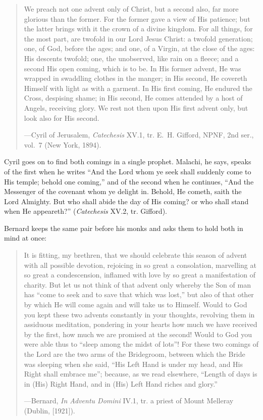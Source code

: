 \begin{quote}
We preach not one advent only of Christ, but a second also, far more glorious than the former.
For the former gave a view of His patience; but the latter brings with it the crown of a divine
kingdom. For all things, for the most part, are twofold in our Lord Jesus Christ: a twofold
generation; one, of God, before the ages; and one, of a Virgin, at the close of the ages: His
descents twofold; one, the unobserved, like rain on a fleece; and a second His open coming,
which is to be. In His former advent, He was wrapped in swaddling clothes in the manger; in His
second, He covereth Himself with light as with a garment. In His first coming, He endured the
Cross, despising shame; in His second, He comes attended by a host of Angels, receiving glory. We
rest not then upon His first advent only, but look also for His second.\par
{\smallskip\noindent\small ---Cyril of Jerusalem, \textit{Catechesis} XV.1, tr. E.~H. Gifford,
NPNF, 2nd ser., vol.~7 (New York, 1894).\par}
\end{quote}

Cyril goes on to find both comings in a single prophet. Malachi, he says, speaks of the first when he writes ``And the Lord whom ye seek shall suddenly come to His
temple; behold one coming,'' and of the second when he continues, ``And the Messenger of the
covenant whom ye delight in. Behold, He cometh, saith the Lord Almighty. But who shall abide the
day of His coming? or who shall stand when He appeareth?'' (\textit{Catechesis} XV.2, tr.
Gifford).

Bernard keeps the same pair before his monks and asks them to hold both in mind at once:

\begin{quote}
It is fitting, my brethren, that we should celebrate this season of advent with all possible
devotion, rejoicing in so great a consolation, marvelling at so great a condescension, inflamed
with love by so great a manifestation of charity. But let us not think of that advent only
whereby the Son of man has ``come to seek and to save that which was lost,'' but also of that
other by which He will come again and will take us to Himself. Would to God you kept these two
advents constantly in your thoughts, revolving them in assiduous meditation, pondering in your
hearts how much we have received by the first, how much we are promised at the second! Would to
God you were able thus to ``sleep among the midst of lots''! For these two comings of the Lord
are the two arms of the Bridegroom, between which the Bride was sleeping when she said, ``His
Left Hand is under my head, and His Right shall embrace me''; because, as we read elsewhere,
``Length of days is in (His) Right Hand, and in (His) Left Hand riches and glory.''\par
{\smallskip\noindent\small ---Bernard, \textit{In Adventu Domini} IV.1, tr. a priest of Mount
Melleray (Dublin, [1921]).\par}
\end{quote}

